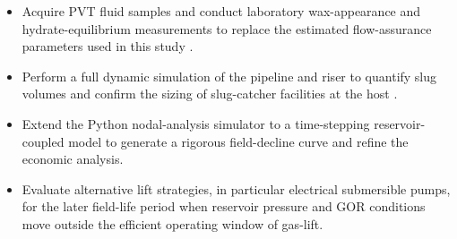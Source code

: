 \begin{itemize}
    \item Acquire PVT fluid samples and conduct laboratory wax-appearance and
          hydrate-equilibrium measurements to replace the estimated
          flow-assurance parameters used in this study \cite{Bai2005}.
    \item Perform a full dynamic simulation of the pipeline and riser to
          quantify slug volumes and confirm the sizing of slug-catcher
          facilities at the host \cite{Schlumberger2023}.
    \item Extend the Python nodal-analysis simulator to
          a time-stepping reservoir-coupled model to generate a rigorous
          field-decline curve and refine the economic analysis.
    \item Evaluate alternative lift strategies, in particular electrical
          submersible pumps, for the later field-life period when reservoir
          pressure and GOR conditions move outside the efficient operating
          window of gas-lift.
\end{itemize}